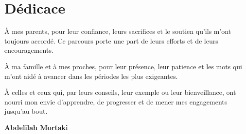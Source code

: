 \chapter*{Dédicace}
\thispagestyle{plain}

\vspace*{1.5cm}

\begin{flushright}
\begin{minipage}{0.74\textwidth}
\itshape\large

À mes parents, pour leur confiance, leurs sacrifices et le soutien qu'ils m'ont toujours accordé. Ce parcours porte une part de leurs efforts et de leurs encouragements.

\vspace{0.65cm}

À ma famille et à mes proches, pour leur présence, leur patience et les mots qui m'ont aidé à avancer dans les périodes les plus exigeantes.

\vspace{0.65cm}

À celles et ceux qui, par leurs conseils, leur exemple ou leur bienveillance, ont nourri mon envie d'apprendre, de progresser et de mener mes engagements jusqu'au bout.

\vspace{1cm}

\begin{flushright}
\textbf{Abdelilah Mortaki}
\end{flushright}

\end{minipage}
\end{flushright}
